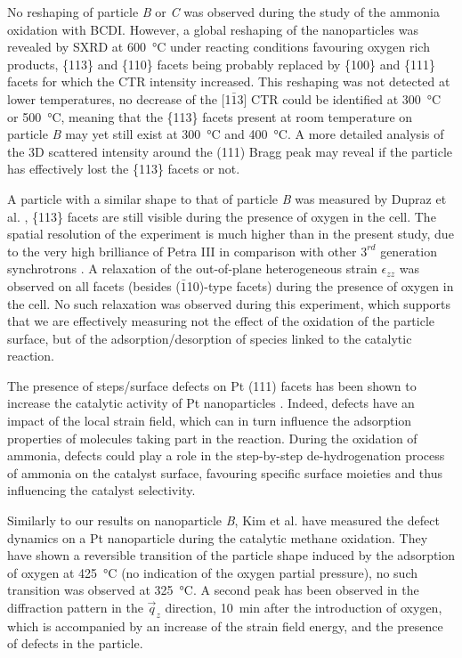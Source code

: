 No reshaping of particle \textit{B} or \textit{C} was observed during the study of the ammonia oxidation with BCDI.
However, a global reshaping of the nanoparticles was revealed by SXRD at \qty{600}{\degreeCelsius} under reacting conditions favouring oxygen rich products, \{113\} and \{110\} facets being probably replaced by \{100\} and \{111\} facets for which the CTR intensity increased.
This reshaping was not detected at lower temperatures, no decrease of the [1$\bar{1}$3] CTR could be identified at \qty{300}{\degreeCelsius} or \qty{500}{\degreeCelsius}, meaning that the \{113\} facets present at room temperature on particle \textit{B} may yet still exist at \qty{300}{\degreeCelsius} and \qty{400}{\degreeCelsius}.
A more detailed analysis of the 3D scattered intensity around the (111) Bragg peak may reveal if the particle has effectively lost the \{113\} facets or not.

A particle with a similar shape to that of particle \textit{B} was measured by Dupraz et al. \parencite{Dupraz2022}, \{113\} facets are still visible during the presence of oxygen in the cell.
The spatial resolution of the experiment is much higher than in the present study, due to the very high brilliance of Petra III in comparison with other $3^{rd}$ generation synchrotrons \parencite{Bilderback2005}.
A relaxation of the out-of-plane heterogeneous strain $\epsilon_{zz}$ was observed on all facets (besides ($\bar{1}$10)-type facets) during the presence of oxygen in the cell.
No such relaxation was observed during this experiment, which supports that we are effectively measuring not the effect of the oxidation of the particle surface, but of the adsorption/desorption of species linked to the catalytic reaction.

The presence of steps/surface defects on Pt (111) facets has been shown to increase the catalytic activity of Pt nanoparticles \parencite{Segner1984, Chen2012}.
Indeed, defects have an impact of the local strain field, which can in turn influence the adsorption properties of molecules taking part in the reaction.
During the oxidation of ammonia, defects could play a role in the step-by-step de-hydrogenation process of ammonia on the catalyst surface, favouring specific surface moieties and thus influencing the catalyst selectivity.

Similarly to our results on nanoparticle \textit{B}, Kim et al. \parencite*{Kim2019} have measured the defect dynamics on a Pt nanoparticle during the catalytic methane oxidation.
They have shown a reversible transition of the particle shape induced by the adsorption of oxygen at \qty{425}{\degreeCelsius} (no indication of the oxygen partial pressure), no such transition was observed at \qty{325}{\degreeCelsius}.
A second peak has been observed in the diffraction pattern in the $\vec{q}_z$ direction, \qty{10}{\minute} after the introduction of oxygen, which is accompanied by an increase of the strain field energy, and the presence of defects in the particle.

